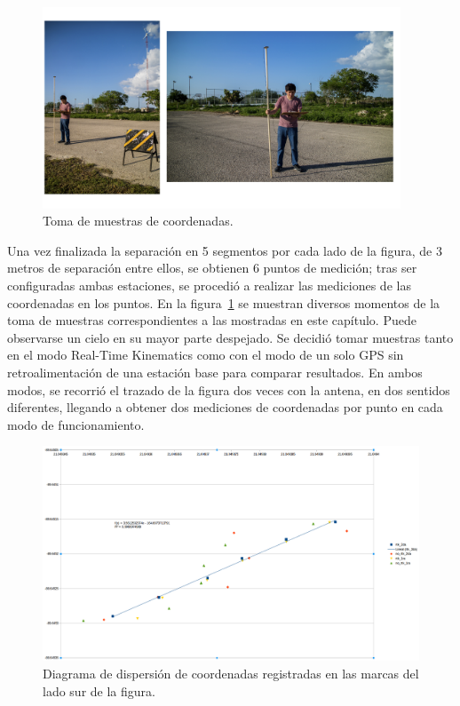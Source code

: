 \begin{figure}[H]
\centering
\includegraphics[width=0.95\textwidth]{Figures/22jpg}
\caption[Toma de muestras de coordenadas.]{Toma de muestras de coordenadas.}
\label{fig:Medc}
\end{figure}

Una vez finalizada la separación en 5 segmentos por cada lado de la figura, de 3 metros de separación entre ellos, se obtienen 6 puntos de medición; tras ser configuradas ambas estaciones, se procedió a realizar las mediciones de las coordenadas en los puntos. En la figura~\ref{fig:Medc} se muestran diversos momentos de la toma de muestras correspondientes a las mostradas en este capítulo. Puede observarse un cielo en su mayor parte despejado. Se decidió tomar muestras tanto en el modo Real-Time Kinematics como con el modo de un solo GPS sin retroalimentación de una estación base para comparar resultados. En ambos modos, se recorrió el trazado de la figura dos veces con la antena, en dos sentidos diferentes, llegando a obtener dos mediciones de coordenadas por punto en cada modo de funcionamiento.\\

\begin{figure}[H]
\centering
\includegraphics[width=1\textwidth]{Figures/Dispers}
\caption[Diagrama de dispersión de datos registrados en las marcas del lado sur de la figura.]{Diagrama de dispersión de coordenadas registradas en las marcas del lado sur de la figura.}
\label{fig:Disp}
\end{figure}

